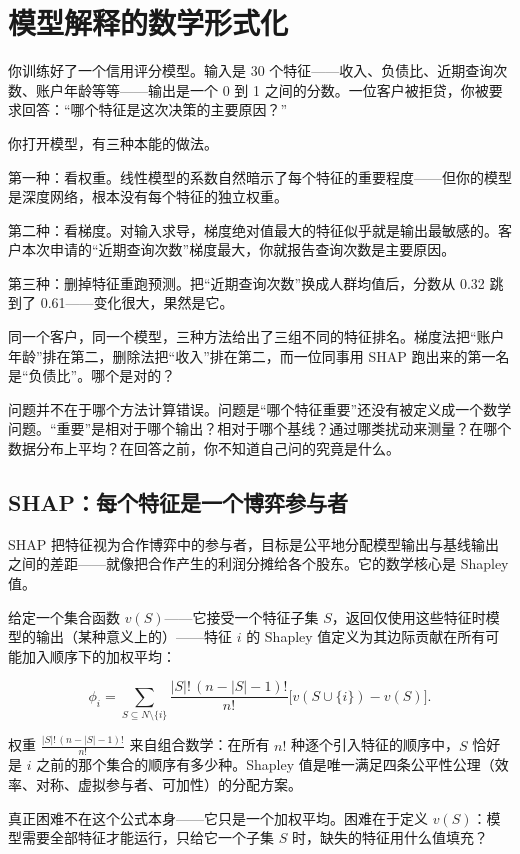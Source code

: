 \section{模型解释的数学形式化}
\label{sec:14-Deep-Learning/07-Interpretability-Mathematics/04}

你训练好了一个信用评分模型。输入是 30 个特征——收入、负债比、近期查询次数、账户年龄等等——输出是一个 0 到 1 之间的分数。一位客户被拒贷，你被要求回答：``哪个特征是这次决策的主要原因？''

你打开模型，有三种本能的做法。

第一种：看权重。线性模型的系数自然暗示了每个特征的重要程度——但你的模型是深度网络，根本没有每个特征的独立权重。

第二种：看梯度。对输入求导，梯度绝对值最大的特征似乎就是输出最敏感的。客户本次申请的``近期查询次数''梯度最大，你就报告查询次数是主要原因。

第三种：删掉特征重跑预测。把``近期查询次数''换成人群均值后，分数从 0.32 跳到了 0.61——变化很大，果然是它。

同一个客户，同一个模型，三种方法给出了三组不同的特征排名。梯度法把``账户年龄''排在第二，删除法把``收入''排在第二，而一位同事用 SHAP 跑出来的第一名是``负债比''。哪个是对的？

问题并不在于哪个方法计算错误。问题是``哪个特征重要''还没有被定义成一个数学问题。``重要''是相对于哪个输出？相对于哪个基线？通过哪类扰动来测量？在哪个数据分布上平均？在回答之前，你不知道自己问的究竟是什么。

\subsection{SHAP：每个特征是一个博弈参与者}

SHAP 把特征视为合作博弈中的参与者，目标是公平地分配模型输出与基线输出之间的差距——就像把合作产生的利润分摊给各个股东。它的数学核心是 Shapley 值。

给定一个集合函数 \(v(S)\)——它接受一个特征子集 \(S\)，返回仅使用这些特征时模型的输出（某种意义上的）——特征 \(i\) 的 Shapley 值定义为其边际贡献在所有可能加入顺序下的加权平均：

\[
\phi_i
= \sum_{S \subseteq N \setminus \{i\}}
\frac{|S|!\,(n - |S| - 1)!}{n!}
\bigl[v(S \cup \{i\}) - v(S)\bigr].
\]

权重 \(\frac{|S|!\,(n-|S|-1)!}{n!}\) 来自组合数学：在所有 \(n!\) 种逐个引入特征的顺序中，\(S\) 恰好是 \(i\) 之前的那个集合的顺序有多少种。Shapley 值是唯一满足四条公平性公理（效率、对称、虚拟参与者、可加性）的分配方案。

真正困难不在这个公式本身——它只是一个加权平均。困难在于定义 \(v(S)\)：模型需要全部特征才能运行，只给它一个子集 \(S\) 时，缺失的特征用什么值填充？

